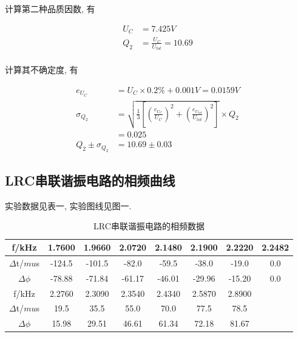 \documentclass[a4paper,12pt,notitlepage]{article}
\begin{document}
	计算第二种品质因数, 有
	
\begin{align*}
	U_C &= 7.425V \\
	Q_2 &= \frac{U_C}{U_{tot}} = 10.69 \\
\end{align*}

	计算其不确定度, 有

\begin{align*}
	e_{U_C} &= U_C \times 0.2\% + 0.001V = 0.0159V \\
	\sigma_{Q_2} &= \sqrt{\frac{1}{3}[(\frac{e_{U_C}}{U_C})^2 + (\frac{e_{U_{tot}}}{U_{tot}})^2]}\times Q_2 \\
	&= 0.025 \\
	Q_2 \pm \sigma_{Q_2} &= 10.69 \pm 0.03
\end{align*}

\subsection{LRC串联谐振电路的相频曲线}

	实验数据见表一, 实验图线见图一. \\

\begin{center}

	\begin{longtable}{|c|c|c|c|c|c|c|c|}
	\caption{LRC串联谐振电路的相频数据} \\
	\hline
	f/kHz & 1.7600 & 1.9660 & 2.0720 & 2.1480 & 2.1900 & 2.2220 & 2.2482 \\
	\hline
	$\Delta$t/$mu$s & -124.5 & -101.5 & -82.0 & -59.5 & -38.0 & -19.0 & 0.0 \\
	\hline
	$\Delta \phi$ & -78.88 & -71.84 & -61.17 & -46.01 & -29.96 & -15.20 & 0.0 \\
	\hline
	\hline
	f/kHz & 2.2760 & 2.3090 & 2.3540 & 2.4340 & 2.5870 & 2.8900 &  \\
	\hline
	$\Delta$t/$mu$s & 19.5 & 35.5 & 55.0 & 70.0 & 77.5 & 78.5 &  \\
	\hline
	$\Delta \phi$ & 15.98 & 29.51 & 46.61 & 61.34 & 72.18 & 81.67 & \\
	\hline
	
	\end{longtable}

\end{center}
\end{document}

